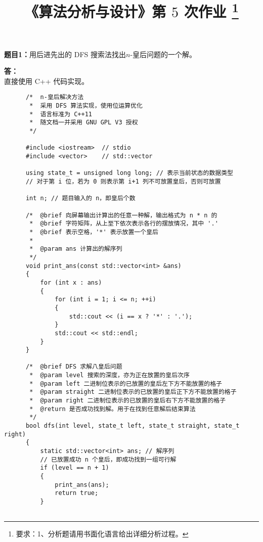 \documentclass[12pt,a4paper]{ctexart}
\title{
  {\heiti《算法分析与设计》第 $5$ 次作业
    \footnote{要求：1、分析题请用书面化语言给出详细分析过程。}
    }
}
\date{}
\begin{document}
  \maketitle


  \noindent
  \section*{\bf \color{red}{算法分析题}}

  \noindent
  {\bf 题目1：}用后进先出的 DFS 搜索法找出$n$-皇后问题的一个解。

  \vspace{5pt}
  \noindent
  {\bf 答：}\\ 直接使用 C++ 代码实现。

  \begin{verbatim}
      /*  n-皇后解决方法
       *  采用 DFS 算法实现，使用位运算优化
       *  语言标准为 C++11
       *  随文档一并采用 GNU GPL V3 授权
       */

      #include <iostream>  // stdio
      #include <vector>    // std::vector

      using state_t = unsigned long long; // 表示当前状态的数据类型
      // 对于第 i 位，若为 0 则表示第 i+1 列不可放置皇后，否则可放置

      int n; // 题目输入的 n，即皇后个数

      /*  @brief 向屏幕输出计算出的任意一种解，输出格式为 n * n 的
       *  @brief 字符矩阵，从上至下依次表示各行的摆放情况，其中 '.'
       *  @brief 表示空格，'*' 表示放置一个皇后
       *
       *  @param ans 计算出的解序列
       */
      void print_ans(const std::vector<int> &ans)
      {
          for (int x : ans)
          {
              for (int i = 1; i <= n; ++i)
              {
                  std::cout << (i == x ? '*' : '.');
              }
              std::cout << std::endl;
          }
      }

      /*  @brief DFS 求解八皇后问题
       *  @param level 搜索的深度，亦为正在放置的皇后次序
       *  @param left 二进制位表示的已放置的皇后左下方不能放置的格子
       *  @param straight 二进制位表示的已放置的皇后正下方不能放置的格子
       *  @param right 二进制位表示的已放置的皇后右下方不能放置的格子
       *  @return 是否成功找到解。用于在找到任意解后结束算法
       */
      bool dfs(int level, state_t left, state_t straight, state_t right)
      {
          static std::vector<int> ans; // 解序列
          // 已放置成功 n 个皇后，即成功找到一组可行解
          if (level == n + 1)
          {
              print_ans(ans);
              return true;
          }


\end{verbatim}
\end{document}
